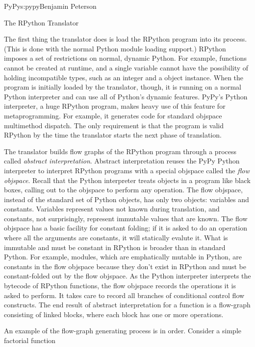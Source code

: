 \begin{aosachapter}{PyPy}{s:pypy}{Benjamin Peterson}
\begin{aosasect1}{The RPython Translator}

The first thing the translator does is load the RPython program into its
process. (This is done with the normal Python module loading support.) RPython
imposes a set of restrictions on normal, dynamic Python. For example, functions
cannot be created at runtime, and a single variable cannot have the possibility
of holding incompatible types, such as an integer and a object instance. When
the program is initially loaded by the translator, though, it is running on a
normal Python interpreter and can use all of Python's dynamic features. PyPy's
Python interpreter, a huge RPython program, makes heavy use of this feature for
metaprogramming. For example, it generates code for standard objspace
multimethod dispatch. The only requirement is that the program is valid RPython
by the time the translator starts the next phase of translation.

The translator builds flow graphs of the RPython program through a process
called \emph{abstract interpretation}. Abstract interpretation reuses the PyPy
Python interpreter to interpret RPython programs with a special objspace called
the \emph{flow objspace}. Recall that the Python interpreter treats objects in a
program like black boxes, calling out to the objspace to perform any
operation. The flow objspace, instead of the standard set of Python objects, has
only two objects: variables and constants. Variables represent values not known
during translation, and constants, not surprisingly, represent immutable values
that are known. The flow objspace has a basic facility for constant folding; if
it is asked to do an operation where all the arguments are constants, it will
statically evalute it. What is immutable and must be constant in RPython is
broader than in standard Python. For example, modules, which are emphatically
mutable in Python, are constants in the flow objspace because they don't exist
in RPython and must be constant-folded out by the flow objspace. As the Python
interpreter interprets the bytecode of RPython functions, the flow objspace
records the operations it is asked to perform. It takes care to record all
branches of conditional control flow constructs. The end result of abstract
interpretation for a function is a flow-graph consisting of linked blocks, where
each block has one or more operations.

An example of the flow-graph generating process is in order. Consider a simple
factorial function


\end{aosasect1}
\end{aosachapter}
